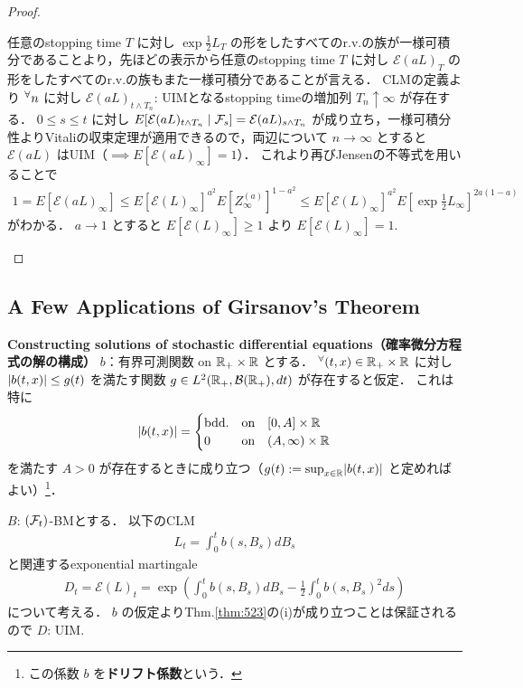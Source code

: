 \documentclass{jsarticle}
\begin{document}
\begin{proof}
\begin{description}
        任意のstopping time $T$ に対し $\exp\frac{1}{2}L_T$ の形をしたすべてのr.v.の族が一様可積分であることより，先ほどの表示から任意のstopping time $T$ に対し $\mathcal{E}(aL)_T$ の形をしたすべてのr.v.の族もまた一様可積分であることが言える．
        CLMの定義より ${}^{\forall} n$ に対し $\mathcal{E}(aL)_{t\wedge T_n}$: UIMとなるstopping timeの増加列 $T_n\uparrow\infty$ が存在する．
        $0\le s\le t$ に対し $E[\mathcal{E}(aL)_{t\wedge T_n}\mid\mathcal{F}_s]=\mathcal{E}(aL)_{s\wedge T_n}$ が成り立ち，一様可積分性よりVitaliの収束定理が適用できるので，両辺について $n\to\infty$ とすると $\mathcal{E}(aL)$ はUIM（$\implies E[\mathcal{E}(aL)_{\infty}]=1$）．
        これより再びJensenの不等式を用いることで
        \begin{align}
            1=E[\mathcal{E}(aL)_{\infty}]
            \le E[\mathcal{E}(L)_\infty]^{a^2}
            E[Z_{\infty}^{(a)}]^{1-a^2}
            \le E[\mathcal{E}(L)_\infty]^{a^2}
            E\left[\exp\frac{1}{2}L_\infty\right]^{2a(1-a)}
        \end{align}
        がわかる．
        $a\to1$ とすると $E[\mathcal{E}(L)_\infty]\ge1$ より $E[\mathcal{E}(L)_\infty]=1.$
    \end{description}
\end{proof}


\subsection{A Few Applications of Girsanov's Theorem}

\textbf{Constructing solutions of stochastic differential equations（確率微分方程式の解の構成）}
$b$：有界可測関数 on $\mathbb{R}_+\times\mathbb{R}$ とする．
${}^{\forall} (t,x)\in\mathbb{R}_+\times\mathbb{R}$ に対し $\lvert b(t,x)\rvert\le g(t)$ を満たす関数 $g\in L^2(\mathbb{R}_+,\mathcal{B}(\mathbb{R}_+),dt)$ が存在すると仮定．
これは特に
\begin{align}
    \lvert b(t,x)\rvert=
    \begin{cases}
        \text{bdd.} &\text{on}\quad [0,A]\times\mathbb{R} \\
        0 &\text{on}\quad (A,\infty)\times\mathbb{R}
    \end{cases}
\end{align}
を満たす $A>0$ が存在するときに成り立つ（$g(t):=\sup_{x\in\mathbb{R}}\lvert b(t,x)\rvert$ と定めればよい）\footnote{この係数 $b$ を\textbf{ドリフト係数}という．}．

$B$: $(\mathcal{F}_t)$-BMとする．
以下のCLM
\begin{align}
    L_t=\int_0^t b(s,B_s)dB_s
\end{align}
と関連するexponential martingale
\begin{align}
    D_t
    = \mathcal{E}(L)_t
    = \exp\left(\int_0^t b(s,B_s)dB_s-\frac{1}{2}\int_0^t b(s,B_s)^2 ds\right)
\end{align}
について考える．
$b$ の仮定よりThm.\ref{thm:523}の(i)が成り立つことは保証されるので $D$: UIM.
\end{document}
